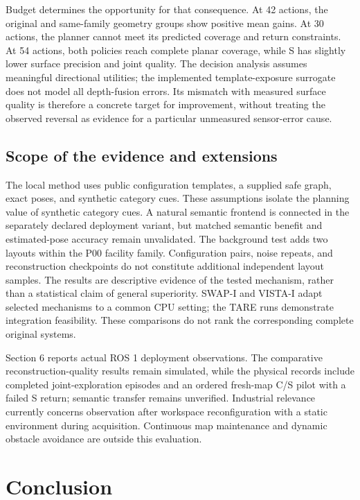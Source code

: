 \documentclass[11pt,a4paper]{article}
\providecommand{\hypertarget}[2]{#2}
\begin{document}
Budget determines the opportunity for that consequence. At 42 actions, the original and same-family geometry groups show positive mean gains. At 30 actions, the planner cannot meet its predicted coverage and return constraints. At 54 actions, both policies reach complete planar coverage, while S has slightly lower surface precision and joint quality. The decision analysis assumes meaningful directional utilities; the implemented template-exposure surrogate does not model all depth-fusion errors. Its mismatch with measured surface quality is therefore a concrete target for improvement, without treating the observed reversal as evidence for a particular unmeasured sensor-error cause.

\hypertarget{scope-of-the-evidence-and-extensions}{%
\subsection{Scope of the evidence and extensions}\label{scope-of-the-evidence-and-extensions}}

The local method uses public configuration templates, a supplied safe graph, exact poses, and synthetic category cues. These assumptions isolate the planning value of synthetic category cues. A natural semantic frontend is connected in the separately declared deployment variant, but matched semantic benefit and estimated-pose accuracy remain unvalidated. The background test adds two layouts within the P00 facility family. Configuration pairs, noise repeats, and reconstruction checkpoints do not constitute additional independent layout samples. The results are descriptive evidence of the tested mechanism, rather than a statistical claim of general superiority. SWAP-I and VISTA-I adapt selected mechanisms to a common CPU setting; the TARE runs demonstrate integration feasibility. These comparisons do not rank the corresponding complete original systems.

Section 6 reports actual ROS 1 deployment observations. The comparative reconstruction-quality results remain simulated, while the physical records include completed joint-exploration episodes and an ordered fresh-map C/S pilot with a failed S return; semantic transfer remains unverified. Industrial relevance currently concerns observation after workspace reconfiguration with a static environment during acquisition. Continuous map maintenance and dynamic obstacle avoidance are outside this evaluation.

\hypertarget{conclusion}{%
\section{Conclusion}\label{conclusion}}
\end{document}
